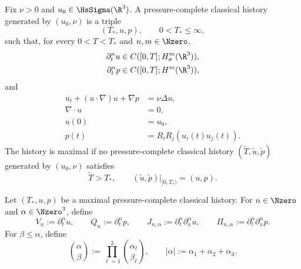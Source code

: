 \begin{samepage}
\begin{definition}
\label{def:formal-maximal-history}
Fix \(\nu>0\) and \(u_0\in\HsSigma(\R^3)\).  A pressure-complete classical
history generated by \((u_0,\nu)\) is a triple
\[
 (T_*,u,p),
 \qquad
 0<T_*\le\infty,
\]
such that, for every \(0<T<T_*\) and \(n,m\in\Nzero\),
\begin{align*}
 \partial_t^nu&\in C([0,T];H^m_\sigma(\R^3)),\\
 \partial_t^np&\in C([0,T];H^m(\R^3)),
\end{align*}
and
\begin{align}
 u_t+(u\cdot\nabla)u+\nabla p&=\nu\Delta u,
 \label{eq:formal-history-momentum}\\
 \nabla\cdot u&=0,
 \label{eq:formal-history-divergence}\\
 u(0)&=u_0,
 \label{eq:formal-history-datum}\\
 p(t)&=R_iR_j(u_i(t)u_j(t)).
 \label{eq:formal-history-pressure}
\end{align}
The history is maximal if no pressure-complete classical history
\((\widetilde T,\widetilde u,\widetilde p)\) generated by \((u_0,\nu)\)
satisfies
\[
 \widetilde T>T_*,
 \qquad
 (\widetilde u,\widetilde p)|_{[0,T_*)}=(u,p).
\]
\end{definition}
\end{samepage}

\begin{definition}
\label{def:formal-mixed-jet}
Let \((T_*,u,p)\) be a maximal pressure-complete classical history.  For
\(n\in\Nzero\) and \(\alpha\in\Nzero^3\), define
\[
 V_n:=\partial_t^nu,
 \qquad
 Q_n:=\partial_t^np,
 \qquad
 J_{n,\alpha}:=\partial_t^n\partial_x^\alpha u,
 \qquad
 \Pi_{n,\alpha}:=\partial_t^n\partial_x^\alpha p.
\]
For \(\beta\le\alpha\), define
\[
 \binom{\alpha}{\beta}
 :=\prod_{\ell=1}^3\binom{\alpha_\ell}{\beta_\ell},
 \qquad
 |\alpha|:=\alpha_1+\alpha_2+\alpha_3.
\]
\end{definition}

